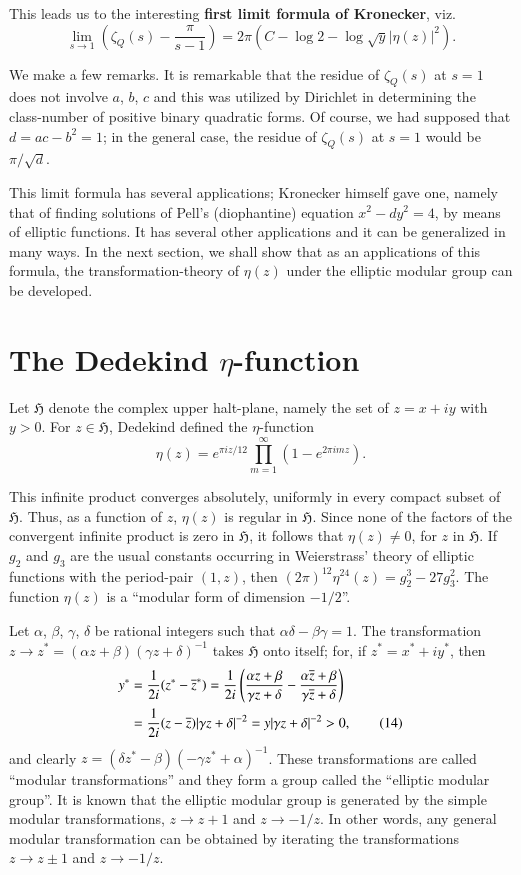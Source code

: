 This leads us to the interesting {\bf first limit formula of
  Kronecker}, viz.
$$
\lim\limits_{s\to
  1}\left(\zeta_{Q}(s)-\frac{\pi}{s-1}\right)=2\pi(C-\log
2-\log\sqrt{y}|\eta(z)|^{2}).
$$

We make a few remarks. It is remarkable that the residue of
$\zeta_{Q}(s)$ at $s=1$ does not involve $a$, $b$, $c$ and this was
utilized by Dirichlet in determining the class-number of positive
binary quadratic forms. Of course, we had supposed that
$d=ac-b^{2}=1$; in the general case, the residue of $\zeta_{Q}(s)$ at
$s=1$ would be $\pi/\sqrt{d}$. 

This limit formula has several applications; Kronecker himself gave
one, namely that of finding solutions of Pell's (diophantine) equation
$x^{2}-dy^{2}=4$, by means of elliptic functions. It has several other
applications and it can be generalized in many ways. In the next
section, we shall show that as an applications of this formula, the
transformation-theory of $\eta(z)$ under the elliptic modular group
can be developed.

\section{The Dedekind $\eta$-function}\label{chap1:sec2}

Let $\mathfrak{H}$ denote the complex upper halt-plane, namely the set
of $z=x+iy$ with $y>0$. For $z\in\mathfrak{H}$, Dedekind defined the
$\eta$-function 
$$
\eta(z)=e^{\pi iz/12}\prod^{\infty}_{m=1}(1-e^{2\pi imz}).
$$\pageoriginale

This infinite product converges absolutely, uniformly in every compact
subset of $\mathfrak{H}$. Thus, as a function of $z$, $\eta(z)$ is
regular in $\mathfrak{H}$. Since none of the factors of the convergent
infinite product is zero in $\mathfrak{H}$, it follows that
$\eta(z)\neq 0$, for $z$ in $\mathfrak{H}$. If $g_{2}$ and $g_{3}$ are
the usual constants occurring in Weierstrass' theory of elliptic
functions with the period-pair $(1,z)$, then
$(2\pi)^{12}\eta^{24}(z)=g^{3}_{2}-27g^{2}_{3}$. The function
$\eta(z)$ is a ``modular form of dimension $-1/2$''.

Let $\alpha$, $\beta$, $\gamma$, $\delta$ be rational integers such
that $\alpha\delta-\beta\gamma=1$. The transformation $z\to
z^{\ast}=(\alpha z+\beta)(\gamma z+\delta)^{-1}$ takes $\mathfrak{H}$
onto itself; for, if $z^{\ast}=x^{\ast}+iy^{\ast}$, then
\begin{align*}
y^{\ast} &=
\frac{1}{2i}(z^{\ast}-\overline{z}^{\ast})=\frac{1}{2i}\left(\frac{\alpha
  z+\beta}{\gamma {z}+\delta} -
\frac{\alpha\overline{z}+\beta}{\gamma\overline{z}+\delta}\right)\\ 
&= \frac{1}{2i}(z-\overline{z})|\gamma z+\delta|^{-2}=y|\gamma
z+\delta|^{-2}>0,\tag{14} \label{14}
\end{align*}
and clearly $z=(\delta z^{\ast}-\beta)(-\gamma
z^{\ast}+\alpha)^{-1}$. These transformations are called ``modular
transformations'' and they form a group called the ``elliptic modular
group''. It is known that the elliptic modular group is generated by
the simple modular transformations, $z\to z+1$ and $z\to -1/z$. In
other words, any general modular transformation can be obtained by
iterating the transformations $z\to z\pm 1$ and $z\to -1/z$.

